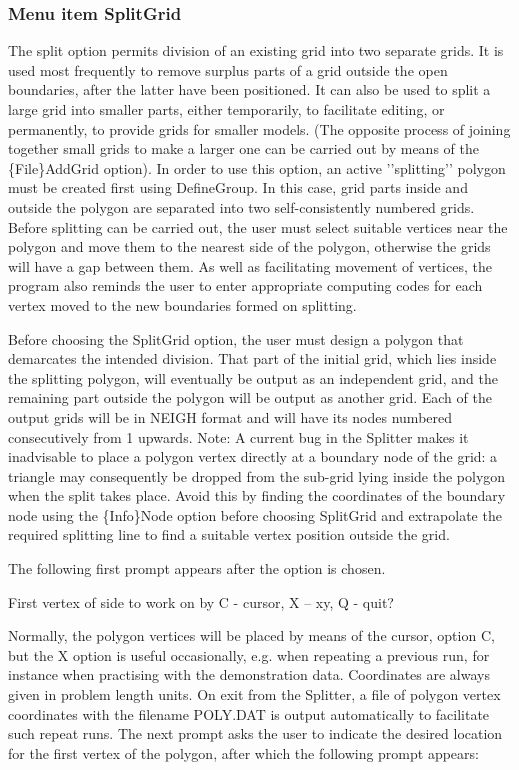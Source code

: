 \documentclass{article}
\begin{document}
\subsubsection[Menu item SplitGrid]{Menu item SplitGrid}
The split option permits division of an existing grid into two separate grids. It is used most frequently to remove surplus parts of a grid outside the open boundaries, after the latter have been positioned. It can also be used to split a large grid into smaller parts, either temporarily, to facilitate editing, or permanently, to provide grids for smaller models. (The opposite process of joining together small grids to make a larger one can be carried out by means of the \{File\}AddGrid option). In order to use this option, an active '{}'splitting'{}' polygon must be created first using DefineGroup. In this case, grid parts inside and outside the polygon are separated into two self-consistently numbered grids. Before splitting can be carried out, the user must select suitable vertices near the polygon and move them to the nearest side of the polygon, otherwise the grids will have a gap between them. As well as facilitating movement of vertices, the program also reminds the user to enter appropriate computing 
codes for each vertex moved to the new boundaries formed on splitting.

Before choosing the SplitGrid option, the user must design a polygon that demarcates the intended division. That part of the initial grid, which lies inside the splitting polygon, will eventually be output as an independent grid, and the remaining part outside the polygon will be output as another grid. Each of the output grids will be in NEIGH format and will have its nodes numbered consecutively from 1 upwards. Note: A current bug in the Splitter makes it inadvisable to place a polygon vertex directly at a boundary node of the grid: a triangle may consequently be dropped from the sub-grid lying inside the polygon when the split takes place. Avoid this by finding the coordinates of the boundary node using the \{Info\}Node option before choosing SplitGrid and extrapolate the required splitting line to find a suitable vertex position outside the grid.

The following first prompt appears after the option is chosen.

First vertex of side to work on by C - cursor, X -- xy, Q - quit?

Normally, the polygon vertices will be placed by means of the cursor, option C, but the X option is useful occasionally, e.g. when repeating a previous run, for instance when practising with the demonstration data. Coordinates are always given in problem length units. On exit from the Splitter, a file of polygon vertex coordinates with the filename POLY.DAT is output automatically to facilitate such repeat runs. The next prompt asks the user to indicate the desired location for the first vertex of the polygon, after which the following prompt appears:
\end{document}
